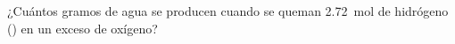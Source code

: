 ¿Cuántos gramos de agua se producen cuando se queman \SI{2,72}{\mol} de hidrógeno () en un exceso de oxígeno?   
